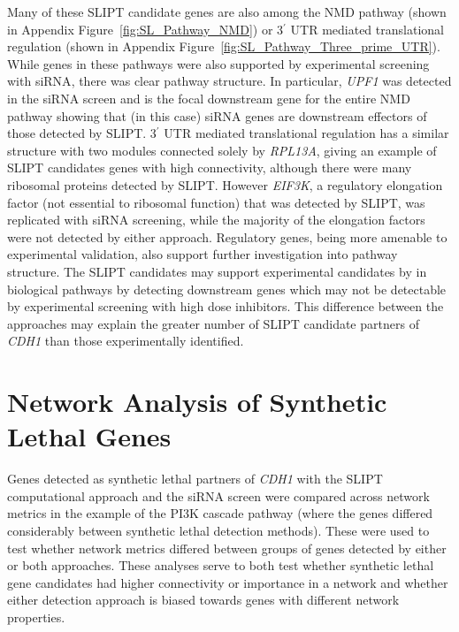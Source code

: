 Many of these \gls{SLIPT} candidate genes are also among the \gls{NMD} pathway (shown in Appendix Figure~\ref{fig:SL_Pathway_NMD}) or 3$^\prime$ \gls{UTR} mediated translational regulation (shown in Appendix Figure~\ref{fig:SL_Pathway_Three_prime_UTR}). While genes in these pathways were also supported by experimental screening with \gls{siRNA}, there was clear pathway structure. In particular, \textit{UPF1} was detected in the \gls{siRNA} screen and is the focal downstream gene for the entire \gls{NMD} pathway showing that (in this case) \gls{siRNA} genes are downstream effectors of those detected by \gls{SLIPT}.  3$^\prime$ \gls{UTR} mediated translational regulation has a similar structure with two modules connected solely by \textit{RPL13A}, giving an example of \gls{SLIPT} candidates genes with high connectivity, although there were many ribosomal proteins detected by \gls{SLIPT}. However \textit{EIF3K}, a regulatory elongation factor (not essential to ribosomal function) that was detected by \gls{SLIPT}, was replicated with \gls{siRNA} screening, while the majority of the elongation factors were not detected by either approach. Regulatory genes, being more amenable to experimental validation, also support further investigation into pathway structure. The \gls{SLIPT} candidates may support experimental candidates by in biological pathways by detecting downstream genes which may not be detectable by experimental screening with high dose inhibitors. This difference between the approaches may explain the greater number of \gls{SLIPT} candidate partners of \textit{CDH1} than those experimentally identified.


\FloatBarrier

\section{Network Analysis of Synthetic Lethal Genes}   \label{chapt4:Network_Test}


Genes detected as synthetic lethal partners of \textit{CDH1} with the \gls{SLIPT} computational approach and the \gls{siRNA} screen \citep{Telford2015} were compared across network metrics in the example of the PI3K cascade pathway (where the genes differed considerably between synthetic lethal detection methods). These were used to test whether network metrics differed  between groups of genes detected by either or both approaches. These analyses serve to both test whether synthetic lethal gene candidates had higher connectivity or importance in a network and whether either detection approach is biased towards genes with different network properties.  

